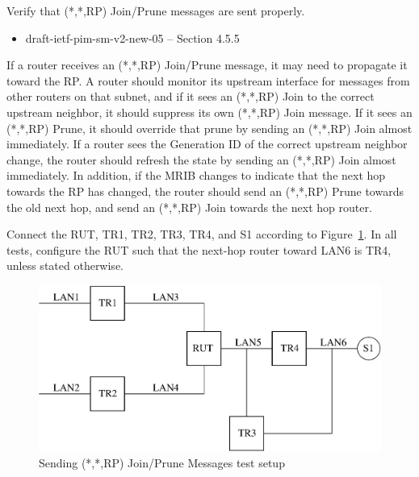 \documentclass[11pt]{report}
\begin{document}
Verify that (*,*,RP) Join/Prune messages are sent properly.

\begin{itemize}
  \item draft-ietf-pim-sm-v2-new-05 -- Section 4.5.5
\end{itemize}

If a router receives an (*,*,RP) Join/Prune message, it may need to propagate
it toward the RP. A router should monitor its upstream interface for messages
from other routers on that subnet, and if it sees an (*,*,RP) Join to the
correct upstream neighbor, it should suppress its own (*,*,RP) Join message.
If it sees an (*,*,RP) Prune, it should override that prune by sending an
(*,*,RP) Join almost immediately. If a router sees the Generation ID of the
correct upstream neighbor change, the router should refresh the state by
sending an (*,*,RP) Join almost immediately. In addition, if the MRIB changes
to indicate that the next hop towards the RP has changed, the router should
send an (*,*,RP) Prune towards the old next hop, and send an (*,*,RP) Join
towards the next hop router.

Connect the RUT, TR1, TR2, TR3, TR4, and S1 according to
Figure~\ref{fig:pim_test_4_5_sending_rp_join_prune_messages}.
In all tests, configure the RUT such that the next-hop router toward LAN6 is
TR4, unless stated otherwise.

\begin{figure}[htbp]
  \begin{center}
    \includegraphics[scale=0.8]{figs/pim_test_4_5_sending_rp_join_prune_messages}
    \caption{Sending (*,*,RP) Join/Prune Messages test setup}
    \label{fig:pim_test_4_5_sending_rp_join_prune_messages}
  \end{center}
\end{figure}
\end{document}
